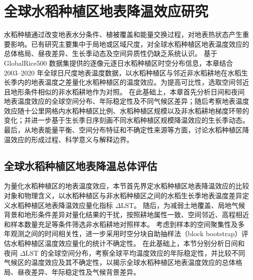 \chapter{全球水稻种植区地表降温效应研究}
水稻种植通过改变地表水分条件、植被覆盖和能量交换过程，对地表热状态产生重要影响\cite{Xue2021RemoteSensing,Liu2022AgForMet}。已有研究主要集中于局地或区域尺度，对全球水稻种植区地表温度效应的总体格局、昼夜差异、生长季动态及空间异质性仍缺乏系统认识。%
基于 GlobalRice500 数据集提供的逐像元逐日水稻种植区时空分布信息，本章结合 2003--2020 年全球日尺度地表温度数据，以水稻种植区与邻近非水稻耕地在水稻生长季内的地表温度之差量化水稻种植区的温度效应。为提高可比性，选取空间邻近且地形条件相似的非水稻耕地作为对照。%
在此基础上，本章首先分析日间和夜间地表温度效应的全球空间分布、年际稳定性及不同气候区差异；随后考察地表温度效应随十公里网格内水稻种植区比例、水稻种植区规模以及非水稻耕地梯度环带的变化；并进一步基于生长季日序刻画不同水稻种植区规模降温效应的生长季动态。%
最后，从地表能量平衡、空间分布特征和不确定性来源等方面，讨论水稻种植区降温效应的形成过程、科学意义与解释边界。

\section{全球水稻种植区地表降温总体评估}
\label{sec:overall_dlst}

为量化水稻种植区的地表温度效应，本节首先界定水稻种植区地表降温效应的比较对象和物理含义，以水稻种植区与非水稻种植区之间的水稻生长季地表温度差异定义水稻种植区地表降温效应量化指标 $\Delta\mathrm{LST}$。
随后，为减弱土地覆盖、局地气候背景和地形条件差异对量化结果的干扰，按照耕地属性一致、空间邻近、高程相近和样本数量充足等条件筛选非水稻耕地对照样本。
考虑到样本的空间聚集性及多年观测之间的时间相关性，进一步采用时空分块自助抽样法（block bootstrap）评估水稻种植区温度效应量化的统计不确定性。
在此基础上，本节分别分析日间和夜间 $\Delta\mathrm{LST}$ 的全球空间分布，考察全球平均温度效应的年际稳定性，并比较不同气候区的温度效应及其不确定性，以揭示全球水稻种植区地表温度效应的总体格局、昼夜差异、年际稳定性及气候背景差异。
\clearpage


